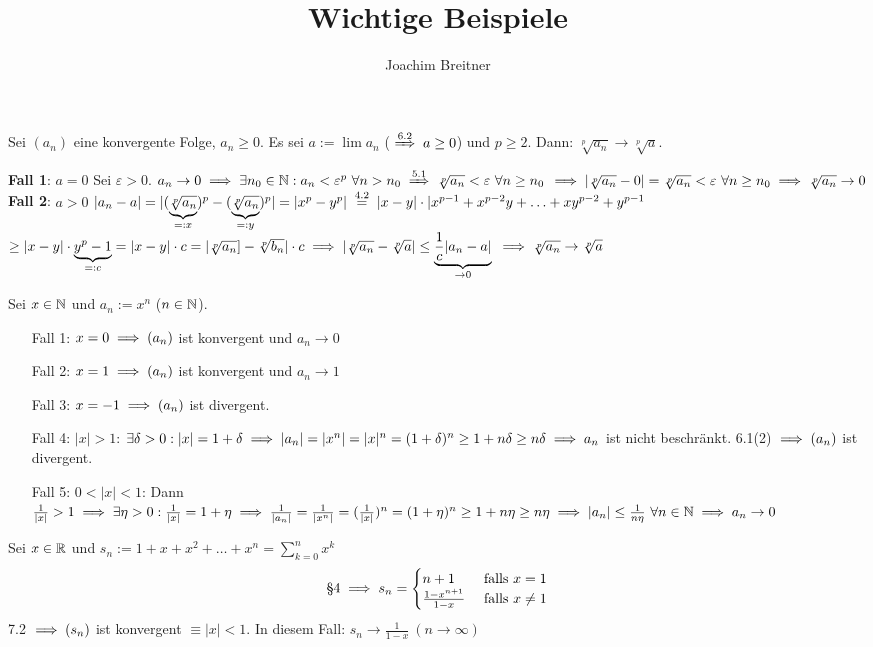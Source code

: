 \documentclass{article}
\title{Wichtige Beispiele}
\author{Joachim Breitner}
\begin{document}
\maketitle

\begin{satz}
Sei $(a_n)$ eine konvergente Folge, $a_n\ge0$. Es sei $a := \lim a_n$ ($\displaystyle\folgtnach{6.2} a \ge 0$) und $p \ge 2$. Dann: $\sqrt[p]{a_n} \to \sqrt[p]{a}$.
\end{satz}

\begin{beweis}
\textbf{Fall 1}: $a=0$ Sei $\varepsilon >0$.
$a_n\to0 \folgt \exists n_0 \in \MdN: a_n < \varepsilon^p \ \forall n >n_0 \folgtnach{5.1} \sqrt[p]{a_n} < \varepsilon \ \forall n \ge n_0 $
$\implies |\sqrt[p]{a_n} - 0| = \sqrt[p]{a_n} < \varepsilon \ \forall n \ge n_0 \implies \sqrt[p]{a_n} \to 0$\\
\textbf{Fall 2}: $a>0$
$ |a_n - a| = |(\underbrace{\sqrt[p]{a_n}}_{=: x})^p - (\underbrace{\sqrt[p]{a_n}}_{=: y})^p| = |x^p - y^p| \gleichnach{4.2} |x - y| \cdot |x^{p-1} + x^{p-2}y + \ldots + xy^{p-2} + y^{p-1}$
$\ge |x-y| \cdot \underbrace{y^p-1}_{=: c} = |x-y|\cdot c = |\sqrt[p]{a_n}] - \sqrt[p]{b_n}|\cdot c \implies |\sqrt[p]{a_n} - \sqrt[p]{a}| \le \underbrace{\frac{1}{c}|a_n-a|}_{\to 0} $
$ \implies \sqrt[p]{a_n} \to \sqrt[p]{a} $
\end{beweis}

\begin{wichtigesbeispiel}
Sei $x\in\mathbb{N}$ und $a_n := x^n$ ($n\in\mathbb{N}$).
\begin{itemize}
\item[Fall 1:] $x=0 \implies (a_n)$ ist konvergent und $a_n \to 0$
\item[Fall 2:] $x=1 \implies (a_n)$ ist konvergent und $a_n \to 1$
\item[Fall 3:] $x=-1 \implies (a_n)$ ist divergent.
\item[Fall 4:] $|x| > 1$: $\exists \delta > 0 : |x| = 1+\delta \implies |a_n| = |x^n| = |x|^n = (1+\delta)^n \ge 1+n\delta \ge n\delta \implies a_n$ ist nicht beschränkt. 6.1(2) $\implies (a_n)$ ist divergent.
\item[Fall 5:] $0 <|x|<1$: Dann $\frac{1}{|x|} > 1 \implies \exists \eta>0: \frac{1}{|x|} = 1+\eta \implies \frac{1}{|a_n|} = \frac{1}{|x^n|} = (\frac{1}{|x|})^n = (1+\eta)^n \ge 1+n\eta \ge n\eta \implies |a_n| \le \frac{1}{n\eta} \ \forall n\in\mathbb{N} \implies a_n \to 0$
\end{itemize}
\end{wichtigesbeispiel}
\begin{wichtigesbeispiel}
\item Sei $x\in\mathbb{R}$ und $s_n := 1+x+x^2+\ldots+x^n=\displaystyle\sum_{k=0}^n x^k$
$$ \text{§4} \implies s_n=\begin{cases}n+1 & \text{ falls }x=1 \\ \frac{1-x^{n+1}}{1-x} & \text{ falls }x\ne 1\end{cases} $$
7.2 $\implies (s_n)$ ist konvergent $\equiv |x| < 1$. In diesem Fall: $s_n \to \frac{1}{1-x}\ (n \to \infty)$
\end{wichtigesbeispiel}
\end{document}
